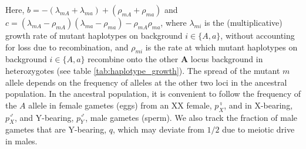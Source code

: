 \documentclass[12pt]{article}
\begin{document}
Here, $b= - (\lambda_{mA} + \lambda_{ma})+(\rho_{mA} + \rho_{ma})$ and $c = (\lambda_{mA}-\rho_{mA}) (\lambda_{ma}-\rho_{ma}) -\rho_{mA} \rho_{ma}$, where $\lambda_{mi}$ is the (multiplicative) growth rate of mutant haplotypes on background $i\in\{A,a\}$, without accounting for loss due to recombination, and $\rho_{mi}$ is the rate at which mutant haplotypes on background $i\in\{A,a\}$ recombine onto the other \textbf{A} locus background in heterozygotes (see table \ref{tab:haplotype_growth}).
The spread of the mutant $m$ allele depends on the frequency of alleles at the other two loci in the ancestral population. 
In the ancestral population, it is convenient to follow the frequency of the $A$ allele in female gametes (eggs) from an XX female, $p^\female_X$, and in X-bearing, $p^\male_X$, and Y-bearing, $p^\male_Y$, male gametes (sperm).
We also track the fraction of male gametes that are Y-bearing, $q$, which may deviate from $1/2$ due to meiotic drive in males. 

%

\end{document}
